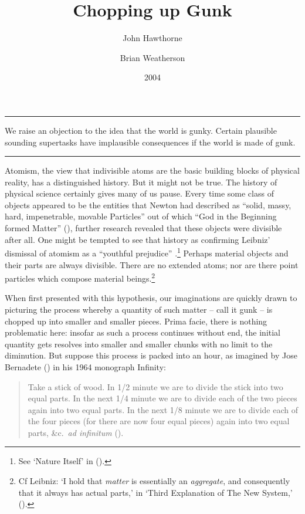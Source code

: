 \documentclass[
  10pt,
  letterpaper,
  DIV=11,
  numbers=noendperiod,
  twoside]{scrartcl}
\title{Chopping up Gunk}
\author{John Hawthorne \and Brian Weatherson}
\date{2004}
\renewenvironment{abstract}
 {\vspace{-1.25cm}
 \quotation\small\noindent\rule{\linewidth}{.5pt}\par\smallskip
 \noindent }
 {\par\noindent\rule{\linewidth}{.5pt}\endquotation}
\begin{document}
\maketitle
\begin{abstract}
We raise an objection to the idea that the world is gunky. Certain
plausible sounding supertasks have implausible consequences if the world
is made of gunk.
\end{abstract}

Atomism, the view that indivisible atoms are the basic building blocks
of physical reality, has a distinguished history. But it might not be
true. The history of physical science certainly gives many of us pause.
Every time some class of objects appeared to be the entities that Newton
had described as ``solid, massy, hard, impenetrable, movable Particles''
out of which ``God in the Beginning formed Matter''
(), further research revealed
that these objects were divisible after all. One might be tempted to see
that history as confirming Leibniz' dismissal of atomism as a ``youthful
prejudice'' .\footnote{See `Nature Itself' in
  ().} Perhaps material
objects and their parts are always divisible. There are no extended
atoms; nor are there point particles which compose material
beings.\footnote{Cf Leibniz: `I hold that \emph{matter} is essentially
  an \emph{aggregate}, and consequently that it always has actual
  parts,' in `Third Explanation of The New System,'
  ().}

When first presented with this hypothesis, our imaginations are quickly
drawn to picturing the process whereby a quantity of such matter -- call
it gunk -- is chopped up into smaller and smaller pieces. Prima facie,
there is nothing problematic here: insofar as such a process continues
without end, the initial quantity gets resolves into smaller and smaller
chunks with no limit to the diminution. But suppose this process is
packed into an hour, as imagined by Jose Bernadete
() in his 1964 monograph Infinity:

\begin{quote}
Take a stick of wood. In 1/2 minute we are to divide the stick into two
equal parts. In the next 1/4 minute we are to divide each of the two
pieces again into two equal parts. In the next 1/8 minute we are to
divide each of the four pieces (for there are now four equal pieces)
again into two equal parts, \&c.~\emph{ad infinitum}
().
\end{quote}
\end{document}
